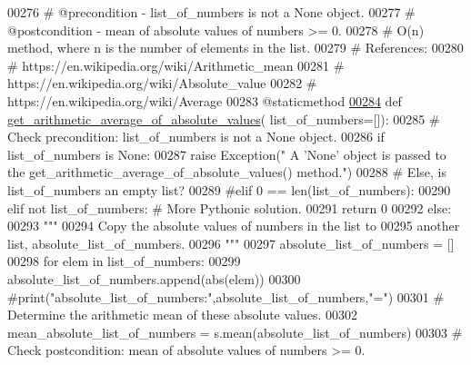 \begin{DoxyCode}
{00276     \textcolor{comment}{#   @precondition - list\_of\_numbers is not a None object.}
00277     \textcolor{comment}{#   @postcondition - mean of absolute values of numbers >= 0.}
00278     \textcolor{comment}{#   O(n) method, where n is the number of elements in the list.}
00279     \textcolor{comment}{#   References:}
00280     \textcolor{comment}{#       https://en.wikipedia.org/wiki/Arithmetic\_mean}
00281     \textcolor{comment}{#       https://en.wikipedia.org/wiki/Absolute\_value}
00282     \textcolor{comment}{#       https://en.wikipedia.org/wiki/Average}
00283     @staticmethod
\hypertarget{data__analysis__tool_8py_source_l00284}{}\hyperlink{classstatistics_1_1data__analysis__tool_1_1data__analysis_a3eb98f0cd57564ad42dd8b2cef5feab5}{00284}     \textcolor{keyword}{def }\hyperlink{classstatistics_1_1data__analysis__tool_1_1data__analysis_a3eb98f0cd57564ad42dd8b2cef5feab5}{get\_arithmetic\_average\_of\_absolute\_values}(
      list\_of\_numbers=[]):
00285         \textcolor{comment}{# Check precondition: list\_of\_numbers is not a None object.}
00286         \textcolor{keywordflow}{if} list\_of\_numbers \textcolor{keywordflow}{is} \textcolor{keywordtype}{None}:
00287             \textcolor{keywordflow}{raise} Exception(\textcolor{stringliteral}{"   A 'None' object is passed to the
       get\_arithmetic\_average\_of\_absolute\_values() method."})
00288         \textcolor{comment}{# Else, is list\_of\_numbers an empty list?}
00289         \textcolor{comment}{#elif 0 == len(list\_of\_numbers):}
00290         \textcolor{keywordflow}{elif} \textcolor{keywordflow}{not} list\_of\_numbers:   \textcolor{comment}{# More Pythonic solution.}
00291             \textcolor{keywordflow}{return} 0
00292         \textcolor{keywordflow}{else}:
00293             \textcolor{stringliteral}{"""}
00294 \textcolor{stringliteral}{                Copy the absolute values of numbers in the list to}
00295 \textcolor{stringliteral}{                    another list, absolute\_list\_of\_numbers.}
00296 \textcolor{stringliteral}{            """}
00297             absolute\_list\_of\_numbers = []
00298             \textcolor{keywordflow}{for} elem \textcolor{keywordflow}{in} list\_of\_numbers:
00299                 absolute\_list\_of\_numbers.append(abs(elem))
00300             \textcolor{comment}{#print("absolute\_list\_of\_numbers:",absolute\_list\_of\_numbers,"=")}
00301             \textcolor{comment}{# Determine the arithmetic mean of these absolute values.}
00302             mean\_absolute\_list\_of\_numbers = s.mean(absolute\_list\_of\_numbers)
00303             \textcolor{comment}{# Check postcondition: mean of absolute values of numbers >= 0.}
}
\end{DoxyCode}
